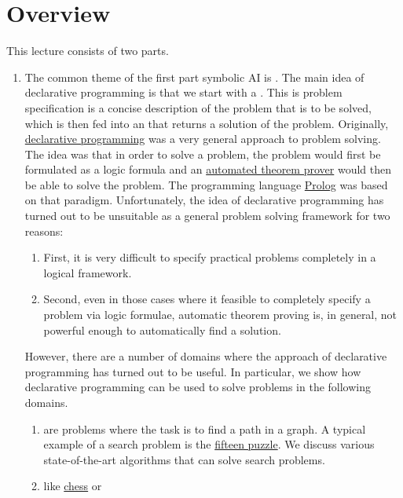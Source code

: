 \section{Overview}
This lecture consists of two parts.
\begin{enumerate}
\item The common theme of the first part symbolic AI is .  
      The main idea of declarative programming is that we start with a .
      This is problem specification is a concise description of the problem that is to be solved, which is
      then fed into an  that returns a solution of the problem.  Originally, 
      \href{https://en.wikipedia.org/wiki/Declarative_programming}{declarative programming} was a very general
      approach to problem solving.  The idea was that in order to solve a problem, the problem would first be
      formulated as a logic formula and an
      \href{https://en.wikipedia.org/wiki/Automated_theorem_proving}{automated theorem prover} would then be
      able to solve the problem.  The programming language \href{https://en.wikipedia.org/wiki/Prolog}{Prolog}
      was based on that paradigm.  Unfortunately, the idea of declarative programming has
      turned out to be unsuitable as a general problem solving framework for two reasons:
      \begin{enumerate}
      \item First, it is very difficult to specify practical problems completely in a logical framework.
      \item Second, even in those cases where it feasible to completely specify a problem via logic formulae,
            automatic theorem proving is, in general, not powerful enough to automatically find a solution. 
      \end{enumerate}
      However, there are a number of domains where the approach of declarative programming has turned out to be
      useful.  In particular, we show how declarative programming can be used to solve problems in the
      following domains.
      \begin{enumerate}
      \item {} are problems where the task is to find a path in a graph.  A typical example of a
            search problem is the \href{https://en.wikipedia.org/wiki/15_puzzle}{fifteen puzzle}.
            We discuss various state-of-the-art algorithms that can solve search problems.
      \item {} like \href{https://en.wikipedia.org/wiki/Chess}{chess} or

\end{enumerate}
\end{enumerate}
